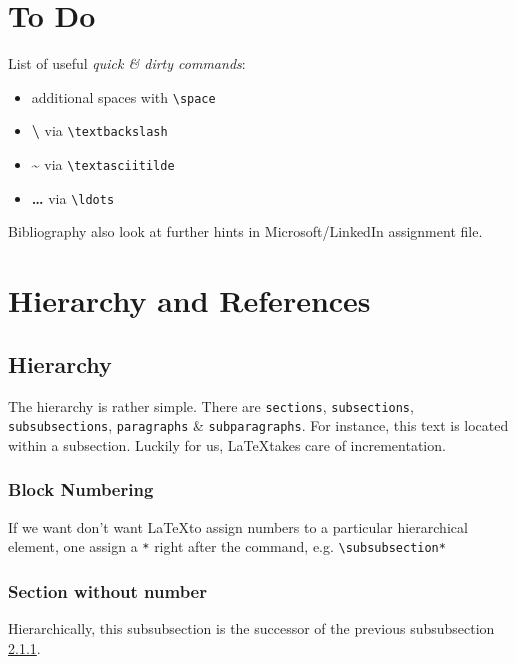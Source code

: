 \documentclass[a4paper]{scrartcl}
\begin{document}
	
	
	
	
	
	
	\section{To Do}
	List of useful \emph{quick \& dirty commands}:
	
	\begin{itemize}
		\item additional \space \space spaces \space \space \space with \texttt{\textbackslash space}
		\item \textbf{\textbackslash} \space via \texttt{\textbackslash textbackslash}
		\item \textbf{\textasciitilde} \space via \texttt{\textbackslash textasciitilde}
		\item \textbf{\ldots} \space via \texttt{\textbackslash ldots}
		
	\end{itemize}
	{\Huge Bibliography}
	also look at further hints in Microsoft/LinkedIn assignment file.
	
	\section{Hierarchy and References}\label{HaR}
	
	\subsection{Hierarchy}\label{Hie}
	
	The hierarchy is rather simple. There are \texttt{sections}, \texttt{subsections}, \texttt{subsubsections}, \texttt{paragraphs} \& \texttt{subparagraphs}. For instance, this text is located within a subsection. Luckily for us, \LaTeX \space takes care of incrementation.
	
	\subsubsection{Block Numbering}\label{sssbn}
	If we want don't want \LaTeX to assign numbers to a particular hierarchical element, one assign a \texttt{*} right after the command, e.g. \texttt{\textbackslash subsubsection*}
	
	\subsubsection*{Section without number}
	Hierarchically, this subsubsection is the successor of the previous subsubsection \ref{sssbn}.
	
\end{document}
